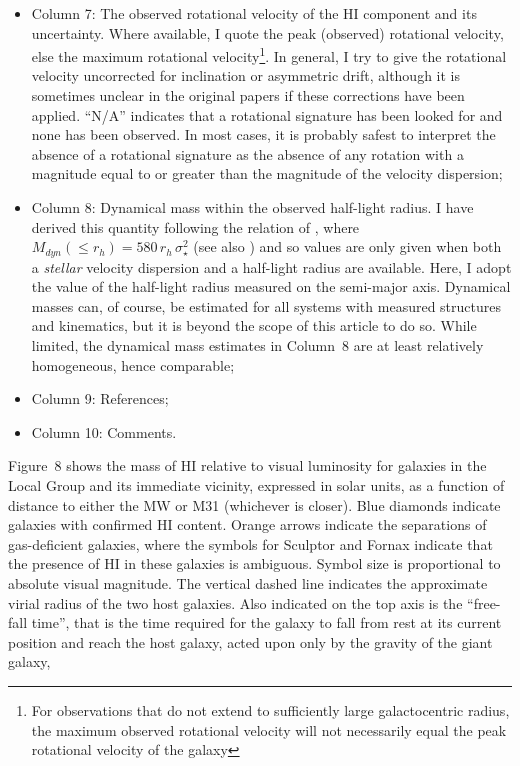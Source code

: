 \documentclass[manuscript]{aastex}
\begin{document}
\begin{itemize}
\item Column 7: The observed rotational velocity of
  the HI component and its uncertainty.  Where available, I quote the
  peak (observed) rotational velocity, else the maximum rotational
  velocity\footnote{For observations that do not extend to
    sufficiently large galactocentric radius, the maximum observed rotational
    velocity will not necessarily equal the peak rotational velocity
    of the galaxy}. In general, I try to give the rotational velocity
  uncorrected for inclination or asymmetric drift, although it is
  sometimes unclear in the original papers if these corrections have
  been applied. ``N/A'' indicates that a rotational signature has been
  looked for and none has been observed. In most cases, it is probably
  safest to interpret the absence of a rotational signature as the
  absence of any rotation with a magnitude equal to or greater than
  the magnitude of the velocity dispersion;

\item Column 8: Dynamical mass within the observed half-light
  radius. I have derived this quantity following the relation of
  \cite{walker2009c}, where $M_{dyn} (\le r_h) = 580\,r_h\,\sigma_\star^2$
  (see also \citealt{wolf2010}) and so values are only given when both
  a {\it stellar} velocity dispersion and a half-light radius are
  available. Here, I adopt the value of the half-light radius measured
  on the semi-major axis. Dynamical masses can, of course, be
  estimated for all systems with measured structures and kinematics,
  but it is beyond the scope of this article to do so. While limited,
  the dynamical mass estimates in Column~8 are at least relatively
  homogeneous, hence comparable;

\item Column 9: References;

\item Column 10: Comments.

\end{itemize}

Figure~8 shows the mass of HI relative to visual luminosity for
galaxies in the Local Group and its immediate vicinity, expressed in
solar units, as a function of distance to either the MW or M31
(whichever is closer). Blue diamonds indicate galaxies with confirmed
HI content. Orange arrows indicate the separations of gas-deficient
galaxies, where the symbols for Sculptor and Fornax indicate that the
presence of HI in these galaxies is ambiguous. Symbol size is
proportional to absolute visual magnitude. The vertical dashed line indicates
the approximate virial radius of the two host galaxies. Also indicated on the top
axis is the ``free-fall time'', that is the time required for the
galaxy to fall from rest at its current position and reach the host galaxy,
acted upon only by the gravity of the giant galaxy,
\end{document}
